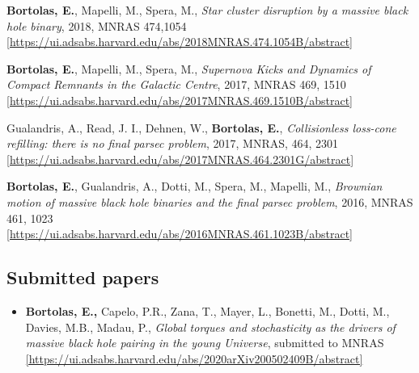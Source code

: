 \begin{etaremune}
\item {\bf Bortolas, E.}, Mapelli, M., Spera, M., { \it Star cluster disruption by a massive black hole binary}, 2018, MNRAS 474,1054 \\ \href{https://ui.adsabs.harvard.edu/abs/2018MNRAS.474.1054B/abstract}{\scriptsize [https://ui.adsabs.harvard.edu/abs/2018MNRAS.474.1054B/abstract]}

\item {\bf Bortolas, E.}, Mapelli, M., Spera, M., {\it Supernova Kicks and Dynamics of Compact Remnants in the Galactic Centre}, 2017, MNRAS 469, 1510 \\ \href{https://ui.adsabs.harvard.edu/abs/2017MNRAS.469.1510B/abstract}{\scriptsize [https://ui.adsabs.harvard.edu/abs/2017MNRAS.469.1510B/abstract]} 

\item Gualandris, A., Read, J. I., Dehnen, W., {\bf Bortolas, E.}, {\it Collisionless loss-cone refilling: there is no final parsec problem}, 2017, MNRAS, 464, 2301 
\\ \href{https://ui.adsabs.harvard.edu/abs/2017MNRAS.464.2301G/abstract}{\scriptsize [https://ui.adsabs.harvard.edu/abs/2017MNRAS.464.2301G/abstract]}


\item {\bf Bortolas, E.}, Gualandris, A., Dotti, M., Spera, M., Mapelli, M., {\it Brownian motion of massive black hole binaries and the final parsec problem}, 2016, MNRAS 461, 1023 \\ \href{https://ui.adsabs.harvard.edu/abs/2016MNRAS.461.1023B/abstract}{\scriptsize [https://ui.adsabs.harvard.edu/abs/2016MNRAS.461.1023B/abstract]}


\end{etaremune}

\subsection*{ Submitted papers }

\begin{itemize}
\setlength\itemsep{-1pt}


\item \textbf{Bortolas, E.,}  Capelo, P.R., Zana, T., Mayer, L., Bonetti, M., Dotti, M., Davies, M.B., Madau, P.,  { \it Global torques and stochasticity as the drivers of massive black hole pairing in the young Universe}, submitted to MNRAS \\ \href{https://ui.adsabs.harvard.edu/abs/2020arXiv200502409B/abstract}{\scriptsize [https://ui.adsabs.harvard.edu/abs/2020arXiv200502409B/abstract]}




\end{itemize}


